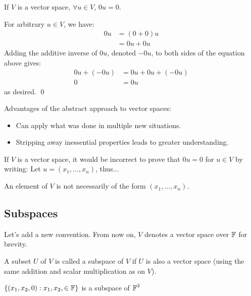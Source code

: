 \begin{theorem}
    If $V$ is a vector space, $\forall u \in V$, $0u = 0$.
    \begin{proof*}
    For arbitrary $u \in V$, we have:
    \begin{align*}
        0u &= (0 + 0)u \\
        &= 0u + 0u
    \end{align*}
    Adding the additive inverse of $0u$, denoted $-0u$, to both sides of the equation
    above gives:
    \begin{align*}
        0u + (-0u) &= 0u + 0u + (-0u) \\
        0 &= 0u
    \end{align*}
    as desired. \qed
    \end{proof*}

\end{theorem}

Advantages of the abstract approach to vector spaces:
\begin{itemize}
    \item Can apply what was done in multiple new situations.
    \item Stripping away inessential properties leads to greater understanding.
\end{itemize}

If $V$ is a vector space, it would be incorrect to prove that $0u = 0$ for $u \in V$
by writing: Let $u = (x_1, \ldots, x_n)$, thus...

\begin{note}
    An element of $V$ is not necessarily of the form $(x_1, \ldots, x_n)$.
\end{note}

\subsection{Subspaces}

Let's add a new convention. From now on, $V$ denotes a vector space over $\operatorname{\mathbb{F}}$
for brevity.

\begin{definition}
    A subset $U$ of $V$ is called a subspace of $V$ if $U$ is also a vector space
    (using the same addition and scalar multiplication as on $V$).
\end{definition}

\begin{example}
    $\{(x_1, x_2, 0) : x_1, x_2, \in \operatorname{\mathbb{F}} \}$ is a subspace of $\operatorname{\mathbb{F}}^3$
\end{example}

